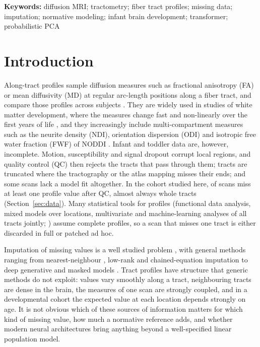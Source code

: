 \documentclass[11pt]{article}
\begin{document}
\noindent\textbf{Keywords:} diffusion MRI; tractometry; fiber tract profiles; missing data; imputation; normative
modeling; infant brain development; transformer; probabilistic PCA

\section{Introduction}

Along-tract profiles sample diffusion measures such as fractional anisotropy (FA) or mean diffusivity (MD) at
regular arc-length positions along a fiber tract, and compare those profiles across subjects
\citep{goodlett2009group,colby2012alongtract,yeatman2012afq,verde2014unc,chandio2020buan}. They are widely used in
studies of white matter development, where the measures change fast and non-linearly over the first years of life
\citep{geng2012tract,dubois2014early,lebel2018development,ouyang2019delineation,stephens2020wm}, and they increasingly
include multi-compartment measures such as the neurite density (NDI), orientation dispersion (ODI) and isotropic free
water fraction (FWF) of NODDI \citep{zhang2012noddi,dean2017onemonth}. Infant and toddler data are, however,
incomplete. Motion, susceptibility and signal dropout corrupt local regions, and quality control (QC) then rejects
the tracts that pass through them; tracts are truncated where the tractography or the atlas mapping misses their ends;
and some scans lack a model fit altogether. In the cohort studied here, \missScansAny{} of \bcpscans{} scans miss at
least one profile value after QC, almost always whole tracts (Section~\ref{sec:data}). Many statistical tools for
profiles (functional data analysis, mixed models over locations, multivariate and machine-learning analyses of all
tracts jointly; \citealp{chamberland2019dimensionality,richiehalford2021afqinsight}) assume complete profiles, so a scan
that misses one tract is either discarded in full or patched ad hoc.

Imputation of missing values is a well studied problem \citep{rubin1976inference,little2019missing}, with general
methods ranging from nearest-neighbour \citep{troyanskaya2001knn}, low-rank \citep{mazumder2010softimpute} and
chained-equation \citep{vanbuuren2011mice} imputation to deep generative and masked models
\citep{yoon2018gain,mattei2019miwae,ma2019eddi,du2024remasker}. Tract profiles have structure that generic methods do
not exploit: values vary smoothly along a tract, neighbouring tracts are dense in the brain, the measures of one scan
are strongly coupled, and in a developmental cohort the expected value at each location depends strongly on age. It is
not obvious which of these sources of information matters for which kind of missing value, how much a normative
reference adds, and whether modern neural architectures bring anything beyond a well-specified linear population
model.
\end{document}

